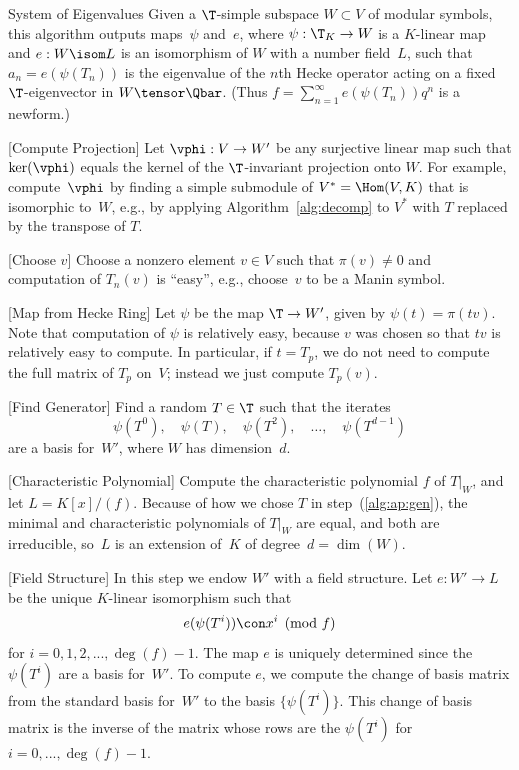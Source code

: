 \begin{algorithm}{System of Eigenvalues}\label{alg:eigsys}%
Given a $\T$-simple subspace $W\subset V$ of modular symbols,
this algorithm outputs maps~$\psi$ and~$e$, where 
$
   \psi : \T_K \to W
$ 
is a $K$-linear map  and $e:W \isom L$ is an isomorphism of $W$ with a
number field~$L$, such that $a_n = e (\psi(T_n))$ is
the eigenvalue of the $n$th Hecke operator acting on a fixed
$\T$-eigenvector in $W\tensor\Qbar$.  (Thus 
$f = \sum_{n=1}^{\infty} e(\psi(T_n)) q^n$ is a newform.)
\begin{steps}

\item{}[Compute Projection] 
Let $\vphi:V \to W'$ be any surjective linear map
such that $\ker(\vphi)$ equals the kernel
of the $\T$-invariant projection onto $W$.
For example, compute~$\vphi$ by finding a simple submodule
of $V^*=\Hom(V,K)$ that is isomorphic to~$W$, e.g., by applying
Algorithm~\ref{alg:decomp} to $V^*$ with $T$ replaced by
the transpose of $T$.   

\item{}[Choose $v$]\label{step:eig:v} Choose a nonzero element
  $v\in{}V$ such that $\pi(v)\neq 0$ and computation of $T_n(v)$ is
  ``easy'', e.g., choose~$v$ to be a Manin symbol.

\item{}[Map from Hecke Ring] Let $\psi$ be the map $\T \to W'$, given 
by $\psi(t) = \pi(t v)$.  Note that computation of $\psi$
is relatively easy, because $v$ was chosen so that
$tv$ is relatively easy to compute.  In particular, 
if $t=T_p$, we do not need to compute the full matrix
of $T_p$ on~$V$; instead we just compute $T_p(v)$.


\item{}[Find Generator]\label{alg:ap:gen} 
Find a random $T \in \T$ such that the iterates 
$$\psi(T^0), \quad \psi(T), \quad \psi(T^2), \quad \ldots, \quad \psi(T^{d-1})$$
are a basis for~$W'$, where $W$ has dimension~$d$. 

\item{}[Characteristic Polynomial] Compute the characteristic polynomial 
$f$ of $T|_W$, and let $L=K[x]/(f)$.
Because
  of how we chose $T$ in step~(\ref{alg:ap:gen}), the minimal
  and characteristic polynomials of $T|_W$ are equal, and
  both are irreducible, so~$L$ is an extension of~$K$ 
  of degree~$d=\dim(W)$. 

\item{}[Field Structure] 
In this step we endow $W'$ with a field structure.
Let $e:W'\to L$ be the unique $K$-linear isomorphism such that 
$$
  e(\psi(T^i)) \con x^i \pmod{f}
$$
for $i = 0,1,2,...,\deg(f)-1$. 
The map $e$ is uniquely determined since the $\psi(T^i)$ are a 
basis for~$W'$.  To compute $e$, we compute
the change of basis matrix from the standard basis for~$W'$ 
to the basis $\{\psi(T^i)\}$.  
This change of basis matrix is the inverse
of the matrix whose rows are the $\psi(T^i)$ 
for $i=0,...,\deg(f)-1$.


\end{steps}
\end{algorithm}
